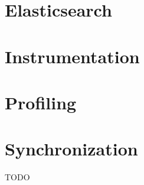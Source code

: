 
\section{Elasticsearch}

\section{Instrumentation}



\section{Profiling}





\section{Synchronization}


TODO


